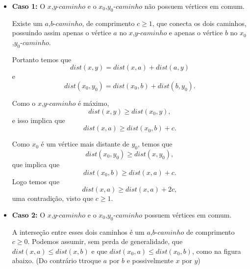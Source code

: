 \documentclass[a4paper,12pt]{article}
\begin{document}
	\begin{itemize}
        \item \textbf{Caso 1:} O $x$,$y$-$caminho$ e o 
        $x_0$,$y_0$-$caminho$ não possuem vértices em comum.

        Existe um $a$,$b$-$caminho$, de 
        comprimento $c \ge 1$, que conecta os dois caminhos, 
        possuindo assim apenas o vértice $a$ no 
        $x$,$y$-$caminho$ e apenas o vértice $b$ no
        $x_0$,$y_0$-$caminho$.

        \begin{center}  \end{center}


        Portanto temos que
        $$ dist(x,y) = dist(x,a) + dist(a,y) $$ e
        $$ dist(x_0,y_0) = dist(x_0,b) + dist(b,y_0).$$

        Como o $x$,$y$-$caminho$ é máximo, 
        $$ dist(x,y)\ge dist(x_0,y),$$
        e isso implica que
        $$ dist(x,a)\ge dist(x_0,b)+c.$$

        Como $x_0$ é um vértice mais distante de $y_0$, temos que 
        $$ dist(x_0,y_0)\ge dist(x,y_0),$$ que implica que
        $$ dist(x_0,b)\ge dist(x,a)+c. $$ 
        Logo temos que
        $$ dist(x,a)\ge dist(x, a)+2c,$$
        uma contradição, visto que
		$c\ge 1$.


		\bigskip
		\bigskip
		\bigskip


		\item \textbf{Caso 2:} O $x$,$y$-$caminho$ e o 
		$x_0$,$y_0$-$caminho$ possuem vértices em comum.

		A interseção entre esses dois caminhos é um 
		$a$,$b$-$caminho$ de comprimento $c \ge 0$.
		Podemos assumir, sem perda de generalidade, que
		$dist(x,a) \le dist(x,b)$ e que
		$dist(x_0,a) \le dist(x_0,b)$, como na figura abaixo.
		(Do contrário ttroque $a$ por $b$ e possivelmente $x$
		por $y$)


\end{itemize}
\end{document}
